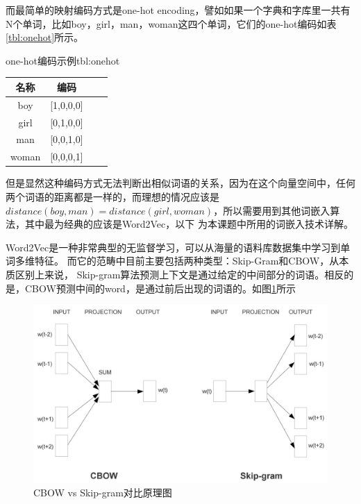 \documentclass[supercite]{HustGraduPaper}
\theoremstyle{definition}
\begin{document}
而最简单的映射编码方式是one-hot encoding，譬如如果一个字典和字库里一共有N个单词，比如boy，girl，man，woman这四个单词，它们的one-hot编码如表\ref{tbl:onehot}所示。
\begin{generaltab}{one-hot编码示例}{tbl:onehot}
  \begin{tabular}{c|ccc}
    \toprule
    名称 & 编码 \\
    \midrule
    boy & [1,0,0,0] \\
    girl & [0,1,0,0] \\
    man & [0,0,1,0] \\
    woman & [0,0,0,1] \\
    \bottomrule
  \end{tabular}
\end{generaltab}

但是显然这种编码方式无法判断出相似词语的关系，因为在这个向量空间中，任何两个词语的距离都是一样的，而理想的情况应该是
$distance(boy, man) = distance(girl, woman)$，所以需要用到其他词嵌入算法，其中最为经典的应该是Word2Vec，以下
为本课题中所用的词嵌入技术详解。

Word2Vec是一种非常典型的无监督学习，可以从海量的语料库数据集中学习到单词多维特征。
而它的范畴中目前主要包括两种类型：Skip-Gram\cite{guthrie2006closer}和CBOW，从本质区别上来说，
Skip-gram算法预测上下文是通过给定的中间部分的词语。相反的是，CBOW预测中间的word，是通过前后出现的词语的。如图\ref{Fig.word2vec}所示

\begin{figure}[htbp] %
  \centering %
  \includegraphics[width=1\textwidth]{images/word2vec.jpg} %
  \caption{CBOW vs Skip-gram对比原理图} %
  \label{Fig.word2vec} %
\end{figure}
\end{document}
